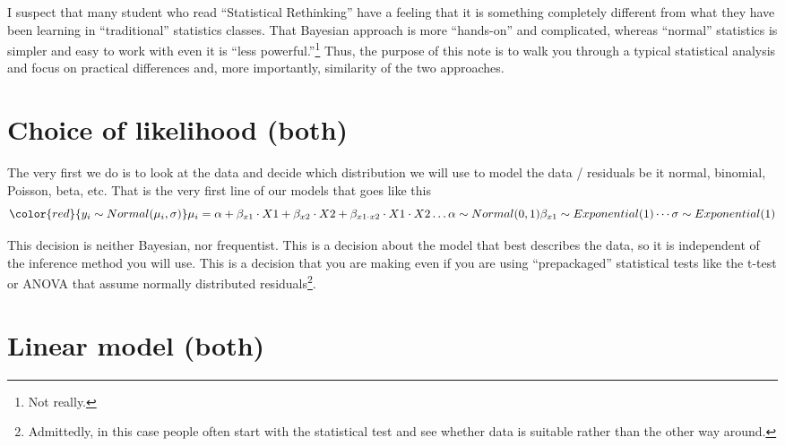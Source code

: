 \documentclass[
]{book}
\begin{document}
I suspect that many student who read ``Statistical Rethinking'' have a feeling that it is something completely different from what they have been learning in ``traditional'' statistics classes. That Bayesian approach is more ``hands-on'' and complicated, whereas ``normal'' statistics is simpler and easy to work with even it is ``less powerful.''\footnote{Not really.} Thus, the purpose of this note is to walk you through a typical statistical analysis and focus on practical differences and, more importantly, similarity of the two approaches.

\hypertarget{choice-of-likelihood-both}{%
\section{Choice of likelihood (both)}\label{choice-of-likelihood-both}}

The very first we do is to look at the data and decide which distribution we will use to model the data / residuals be it normal, binomial, Poisson, beta, etc. That is the very first line of our models that goes like this
\[
\color{red}{y_i \sim Normal(\mu_i, \sigma)} \\
\mu_i = \alpha + \beta_{x1} \cdot X1 + \beta_{x2} \cdot X2 + \beta_{x1\cdot x2} \cdot X1 \cdot X2 \dotso \\
\alpha \sim Normal(0, 1) \\
\beta_{x1} \sim Exponential(1) \\
\cdots \\
\sigma \sim Exponential(1)
\]

This decision is neither Bayesian, nor frequentist. This is a decision about the model that best describes the data, so it is independent of the inference method you will use. This is a decision that you are making even if you are using ``prepackaged'' statistical tests like the t-test or ANOVA that assume normally distributed residuals\footnote{Admittedly, in this case people often start with the statistical test and see whether data is suitable rather than the other way around.}.

\hypertarget{linear-model-both}{%
\section{Linear model (both)}\label{linear-model-both}}
\end{document}
